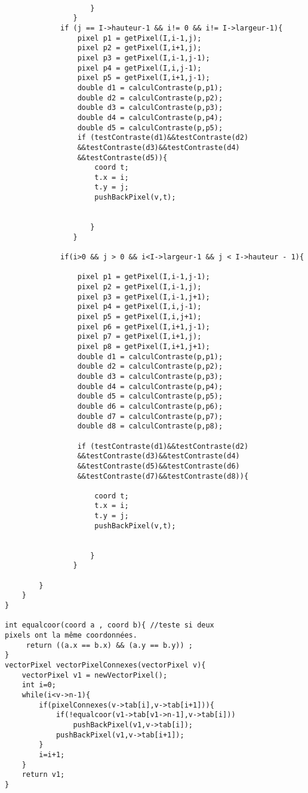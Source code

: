 \documentclass[a4paper , 10pt]{article}
\begin{document}
\begin{verbatim}
	                  
        	        }
                }
             if (j == I->hauteur-1 && i!= 0 && i!= I->largeur-1){
                 pixel p1 = getPixel(I,i-1,j);
        	     pixel p2 = getPixel(I,i+1,j);
        	     pixel p3 = getPixel(I,i-1,j-1);
        	     pixel p4 = getPixel(I,i,j-1);
        	     pixel p5 = getPixel(I,i+1,j-1);
        	     double d1 = calculContraste(p,p1);
	             double d2 = calculContraste(p,p2);
	             double d3 = calculContraste(p,p3);
	             double d4 = calculContraste(p,p4);
	             double d5 = calculContraste(p,p5);
                 if (testContraste(d1)&&testContraste(d2)
                 &&testContraste(d3)&&testContraste(d4)
                 &&testContraste(d5)){
            	     coord t;
                     t.x = i;
	                 t.y = j;
	                 pushBackPixel(v,t);
	                 
	                  
        	        }
        	    }

             if(i>0 && j > 0 && i<I->largeur-1 && j < I->hauteur - 1){
	    
	             pixel p1 = getPixel(I,i-1,j-1);
	             pixel p2 = getPixel(I,i-1,j);
	             pixel p3 = getPixel(I,i-1,j+1);
	             pixel p4 = getPixel(I,i,j-1); 
	             pixel p5 = getPixel(I,i,j+1); 
	             pixel p6 = getPixel(I,i+1,j-1); 
	             pixel p7 = getPixel(I,i+1,j);
	             pixel p8 = getPixel(I,i+1,j+1);
	             double d1 = calculContraste(p,p1);
	             double d2 = calculContraste(p,p2);
	             double d3 = calculContraste(p,p3);
	             double d4 = calculContraste(p,p4);
	             double d5 = calculContraste(p,p5);
	             double d6 = calculContraste(p,p6);
	             double d7 = calculContraste(p,p7);
	             double d8 = calculContraste(p,p8);

	             if (testContraste(d1)&&testContraste(d2)
	             &&testContraste(d3)&&testContraste(d4)
	             &&testContraste(d5)&&testContraste(d6)
	             &&testContraste(d7)&&testContraste(d8)){
	  
      	             coord t;
                     t.x = i;
	                 t.y = j;
	                 pushBackPixel(v,t);
	                 
	                 
	                }
                }     		     

        }
    }  
}

int equalcoor(coord a , coord b){ //teste si deux 
pixels ont la même coordonnées.
     return ((a.x == b.x) && (a.y == b.y)) ;
}
vectorPixel vectorPixelConnexes(vectorPixel v){
	vectorPixel v1 = newVectorPixel();
	int i=0;
	while(i<v->n-1){
		if(pixelConnexes(v->tab[i],v->tab[i+1])){
			if(!equalcoor(v1->tab[v1->n-1],v->tab[i]))
				pushBackPixel(v1,v->tab[i]);
			pushBackPixel(v1,v->tab[i+1]);
		}
		i=i+1;
	}
	return v1;
}


\end{verbatim}
\end{document}

